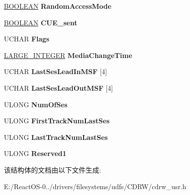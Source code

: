 \begin{DoxyCompactItemize}
\hyperlink{_processor_bind_8h_a112e3146cb38b6ee95e64d85842e380a}{B\+O\+O\+L\+E\+AN} {\bfseries Random\+Access\+Mode}
\item 
\mbox{\label{struct___d_i_s_c___s_t_a_t_u_s___i_n_f_o___u_s_e_r___o_u_t_a6f298a473ebe94679cef11c88c53ac7b}} 
\hyperlink{_processor_bind_8h_a112e3146cb38b6ee95e64d85842e380a}{B\+O\+O\+L\+E\+AN} {\bfseries C\+U\+E\+\_\+sent}
\item 
\mbox{\label{struct___d_i_s_c___s_t_a_t_u_s___i_n_f_o___u_s_e_r___o_u_t_a78202c4c280db152694db8e73931e232}} 
U\+C\+H\+AR {\bfseries Flags}
\item 
\mbox{\label{struct___d_i_s_c___s_t_a_t_u_s___i_n_f_o___u_s_e_r___o_u_t_a73a26bb85dde7e775240894590fecc23}} 
\hyperlink{union___l_a_r_g_e___i_n_t_e_g_e_r}{L\+A\+R\+G\+E\+\_\+\+I\+N\+T\+E\+G\+ER} {\bfseries Media\+Change\+Time}
\item 
\mbox{\label{struct___d_i_s_c___s_t_a_t_u_s___i_n_f_o___u_s_e_r___o_u_t_a5b8b1b39ddbb0aa6df09a87d570248f4}} 
U\+C\+H\+AR {\bfseries Last\+Ses\+Lead\+In\+M\+SF} \mbox{[}4\mbox{]}
\item 
\mbox{\label{struct___d_i_s_c___s_t_a_t_u_s___i_n_f_o___u_s_e_r___o_u_t_a483dc5f523da9f967ac5369276cd38b2}} 
U\+C\+H\+AR {\bfseries Last\+Ses\+Lead\+Out\+M\+SF} \mbox{[}4\mbox{]}
\item 
\mbox{\label{struct___d_i_s_c___s_t_a_t_u_s___i_n_f_o___u_s_e_r___o_u_t_ab80a9003caa92ba953c88e770533993d}} 
U\+L\+O\+NG {\bfseries Num\+Of\+Ses}
\item 
\mbox{\label{struct___d_i_s_c___s_t_a_t_u_s___i_n_f_o___u_s_e_r___o_u_t_af54f605061faf1bdf2ae7ffde8d04d86}} 
U\+L\+O\+NG {\bfseries First\+Track\+Num\+Last\+Ses}
\item 
\mbox{\label{struct___d_i_s_c___s_t_a_t_u_s___i_n_f_o___u_s_e_r___o_u_t_a778bc737b2e5c759bdcae25d6cb0d2f8}} 
U\+L\+O\+NG {\bfseries Last\+Track\+Num\+Last\+Ses}
\item 
\mbox{\label{struct___d_i_s_c___s_t_a_t_u_s___i_n_f_o___u_s_e_r___o_u_t_a471afa7c2e15b431f4326bd95305de09}} 
U\+L\+O\+NG {\bfseries Reserved1}
\end{DoxyCompactItemize}


该结构体的文档由以下文件生成\+:\begin{DoxyCompactItemize}
\item 
E\+:/\+React\+O\+S-\/0../drivers/filesystems/udfs/\+C\+D\+R\+W/cdrw\+\_\+usr.\+h\end{DoxyCompactItemize}
